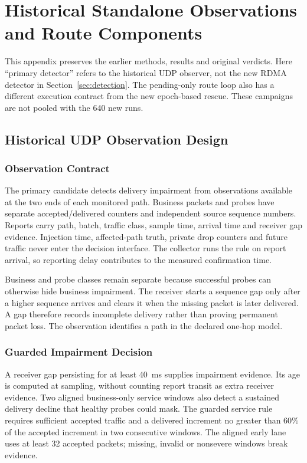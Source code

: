 \documentclass[sigconf]{acmart}
\begin{document}
\section{Historical Standalone Observations and Route Components}
\label{app:historical-udp}
This appendix preserves the earlier methods, results and original verdicts.
Here ``primary detector'' refers to the historical UDP observer, not the
new RDMA detector in Section~\ref{sec:detection}. The pending-only route
loop also has a different execution contract from the new epoch-based rescue.
These campaigns are not pooled with the 640 new runs.

\subsection{Historical UDP Observation Design}
\label{app:udp-observation-design}
\subsubsection{Observation Contract}
The primary candidate detects delivery impairment from observations
available at the two ends of each monitored path. Business packets and
probes have separate accepted/delivered counters and independent source
sequence numbers. Reports carry path, batch, traffic class, sample time,
arrival time and receiver gap evidence. Injection time, affected-path truth,
private drop counters and future traffic never enter the decision interface.
The collector runs the rule on report arrival, so reporting delay contributes
to the measured confirmation time.

Business and probe classes remain separate because successful probes can
otherwise hide business impairment. The receiver starts a sequence gap only
after a higher sequence arrives and clears it when the missing packet is
later delivered. A gap therefore records incomplete delivery rather than
proving permanent packet loss. The observation identifies a path in the
declared one-hop model.

\subsubsection{Guarded Impairment Decision}
A receiver gap persisting for at least 40~ms supplies impairment evidence.
Its age is computed at sampling, without counting report transit as extra
receiver evidence. Two aligned business-only service windows also detect
a sustained delivery decline that healthy probes could mask. The guarded
service rule requires sufficient accepted traffic and a delivered increment
no greater than 60\% of the accepted increment in two consecutive windows.
The aligned early lane uses at least 32 accepted packets; missing, invalid
or nonsevere windows break evidence.
\end{document}
